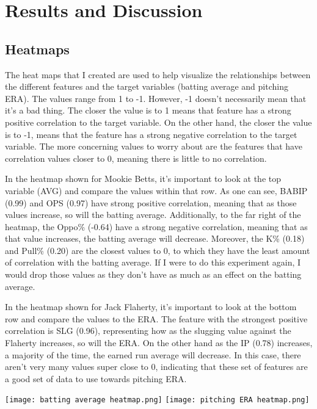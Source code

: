 \documentclass[10pt,twocolumn]{article}
\begin{document}
\section{Results and Discussion}
\subsection{Heatmaps}
The heat maps that I created are used to help visualize the relationships between the different features and the target variables (batting average and pitching ERA). The values range from 1 to -1. However, -1 doesn’t necessarily mean that it’s a bad thing. The closer the value is to 1 means that feature has a strong positive correlation to the target variable. On the other hand, the closer the value is to -1, means that the feature has a strong negative correlation to the target variable. The more concerning values to worry about are the features that have correlation values closer to 0, meaning there is little to no correlation.   

In the heatmap shown for Mookie Betts, it’s important to look at the top variable (AVG) and compare the values within that row. As one can see, BABIP (0.99) and OPS (0.97) have strong positive correlation, meaning that as those values increase, so will the batting average. Additionally, to the far right of the heatmap, the Oppo\% (-0.64) have a strong negative correlation, meaning that as that value increases, the batting average will decrease. Moreover, the K\% (0.18) and Pull\% (0.20) are the closest values to 0, to which they have the least amount of correlation with the batting average. If I were to do this experiment again, I would drop those values as they don’t have as much as an effect on the batting average.  

In the heatmap shown for Jack Flaherty, it’s important to look at the bottom row and compare the values to the ERA. The feature with the strongest positive correlation is SLG (0.96), representing how as the slugging value against the Flaherty increases, so will the ERA. On the other hand as the IP (0.78) increases, a majority of the time, the earned run average will decrease. In this case, there aren’t very many values super close to 0, indicating that these set of features are a good set of data to use towards pitching ERA. 

{\centering
\texttt{[image: batting average heatmap.png]}}
{\centering
\texttt{[image: pitching ERA heatmap.png]}}
\end{document}
